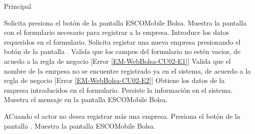 \begin{UCtrayectoria}{Principal}
	\UCPaso[\UCActor]




	\UCpaso [\UCactor] Solicita presiona el botón  de la pantalla ESCOMobile Bolsa. 
	\UCpaso Muestra la pantalla  con el formulario necesario para registrar a la empresa. 
	\UCpaso [\UCactor] Introduce los datos requeridos en el formulario. 
	\UCpaso [\UCactor] Solicita registar una nueva empresa presionando el botón  de la pantalla .  
	\UCpaso Valida que los campos del formulario no estén vacios, de acuedo a la regla de negocio  [Error \ref{EM-WebBolsa-CU02-E1}] 
	\UCpaso Valida que el nombre de la emrpesa no se encuentre registrado ya en el sistema, de acuerdo a la regla de negocio  [Error \ref{EM-WebBolsa-CU02-E2}] 
	\UCpaso Obtiene los datos de la empresa introducidos en el formulario. 
	\UCpaso Persiste la información en el sistema.
	\UCpaso Muestra el mensaje  en la pantalla ESCOMobile Bolsa.  
\end{UCtrayectoria}

\begin{UCtrayectoriaA}{A}{Cuando el actor no desea registrar más una empresa.}
	\UCpaso [\UCactor] Presiona el botón  de la pantalla . 
	\UCpaso Muestra la pantalla ESCOMobile Bolsa.  
\end{UCtrayectoriaA}


